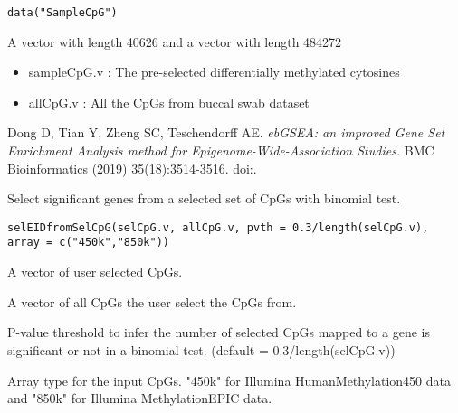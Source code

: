 \documentclass[letterpaper]{book}
\begin{document}
%
\begin{Usage}
\begin{verbatim}
data("SampleCpG")
\end{verbatim}
\end{Usage}
%
\begin{Format}
A vector with length 40626 and a vector with length 484272
\end{Format}
%
\begin{Details}\relax
\begin{itemize}

\item{} sampleCpG.v : The pre-selected differentially methylated cytosines
\item{} allCpG.v : All the CpGs from buccal swab dataset

\end{itemize}

\end{Details}
%
\begin{References}\relax
Dong D, Tian Y, Zheng SC, Teschendorff AE.
\emph{ebGSEA: an improved Gene Set Enrichment Analysis method for Epigenome-Wide-Association Studies.}
BMC Bioinformatics (2019) 35(18):3514-3516.
doi:.
\end{References}
%
\begin{Description}\relax
Select significant genes from a selected set of CpGs with binomial test.
\end{Description}
%
\begin{Usage}
\begin{verbatim}
selEIDfromSelCpG(selCpG.v, allCpG.v, pvth = 0.3/length(selCpG.v), array = c("450k","850k"))
\end{verbatim}
\end{Usage}
%
\begin{Arguments}
\begin{ldescription}
\item[\code{selCpG.v}] A vector of user selected CpGs.

\item[\code{allCpG.v}] A vector of all CpGs the user select the CpGs from.

\item[\code{pvth}] P-value threshold to infer the number of selected CpGs mapped to a gene is significant or not in a binomial test. (default = 0.3/length(selCpG.v))

\item[\code{array}] Array type for the input CpGs. "450k" for Illumina HumanMethylation450 data and "850k" for Illumina MethylationEPIC data.
\end{ldescription}
\end{Arguments}
\end{document}
